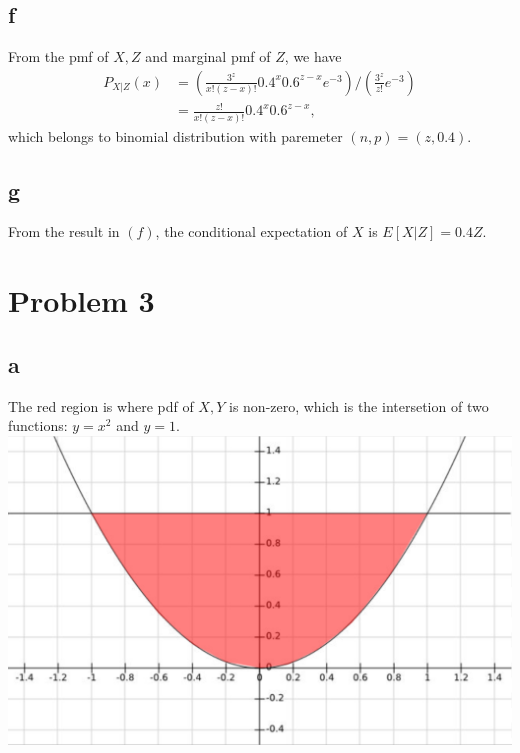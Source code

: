 \documentclass[12pt,letterpaper]{article}
\begin{document}
    \subsection*{f}
        From the pmf of $X, Z$ and marginal pmf of $Z$, we have
        \begin{equation*}
            \begin{aligned}
                P_{X | Z}(x) &= (\frac{3^{z}}{x!(z - x)!} 0.4^{x} 0.6^{z - x} e^{-3}) / (\frac{3^{z}}{z!}e^{-3}) \\
                &= \frac{z!}{x!(z - x)!} 0.4^{x} 0.6^{z - x},
            \end{aligned}
        \end{equation*}
        which belongs to binomial distribution with paremeter $(n, p) = (z, 0.4)$.
    \subsection*{g}
        From the result in $(f)$, the conditional expectation of $X$ is $E[X | Z] = 0.4Z$.

\section*{Problem 3}
    \subsection*{a}
        The red region is where pdf of $X, Y$ is non-zero, which is the intersetion of two functions: $y = x^{2}$ and $y = 1$. \\
        \includegraphics[scale=0.6]{pdf.png}
\end{document}
